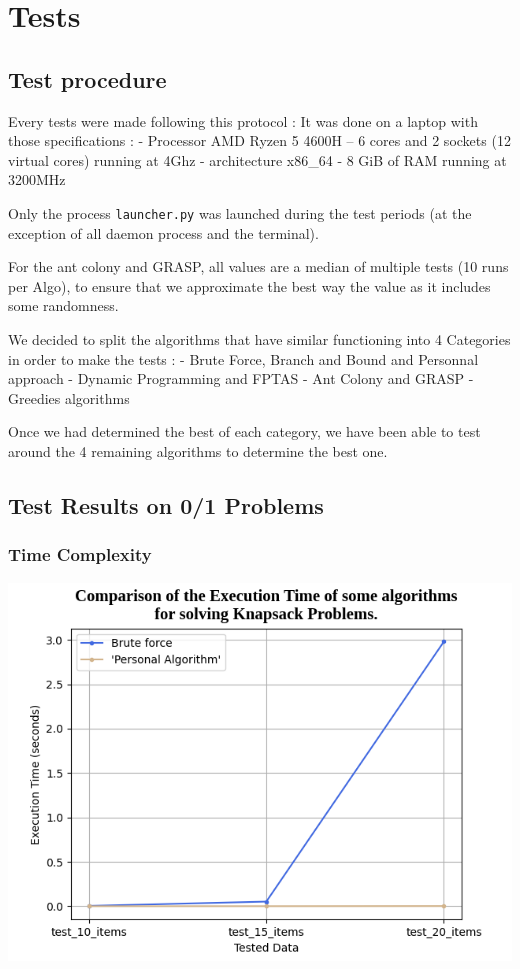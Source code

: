 \documentclass[a4paper, 11pt]{article}
\begin{document}
\section{Tests}
    \subsection{Test procedure}

    Every tests were made following this protocol :
    It was done on a laptop with those specifications :
    \tabto{1.5cm} - Processor AMD Ryzen 5 4600H
    \tabto{2.5cm} -- 6 cores and 2 sockets (12 virtual cores) running at 4Ghz
    \tabto{1.5cm} - architecture x86\_64
    \tabto{1.5cm} - 8 GiB of RAM running at 3200MHz

    Only the process \verb+launcher.py+ was launched during the test periods (at the exception of all daemon process and the terminal).

    For the ant colony and GRASP, all values are a median of multiple tests (10 runs per Algo), to ensure that we approximate the best way the value as it includes some randomness.

    We decided to split the algorithms that have similar functioning into 4 Categories in order to make the tests :
    \tabto{1.5cm} - Brute Force, Branch and Bound and Personnal approach
    \tabto{1.5cm} - Dynamic Programming and FPTAS
    \tabto{1.5cm} - Ant Colony and GRASP
    \tabto{1.5cm} - Greedies algorithms
    
    Once we had determined the best of each category, we have been able to test around the 4 remaining algorithms to determine the best one.

    \subsection{Test Results on 0/1 Problems}
        \subsubsection{Time Complexity}
            \includegraphics[scale = 0.5]{graph_bf_perso.png}
            
\end{document}
